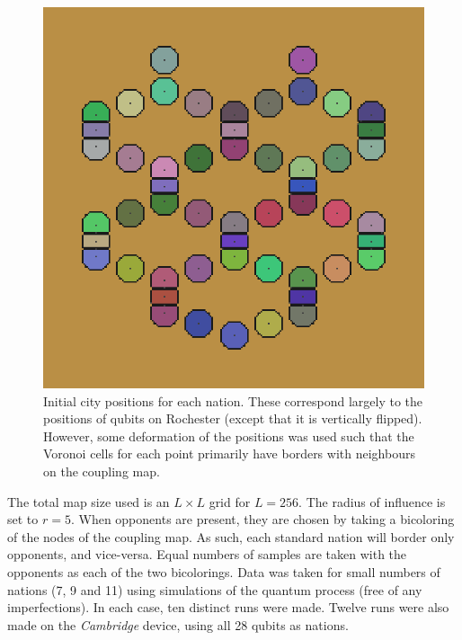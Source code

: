 \documentclass[conference]{IEEEtran}
\begin{document}
\begin{figure}[htbp]
\begin{center}
\includegraphics[width=0.95\columnwidth]{figures/initial.png}
\caption{Initial city positions for each nation. These correspond largely to the positions of qubits on Rochester (except that it is vertically flipped). However, some deformation of the positions was used such that the Voronoi cells for each point primarily have borders with neighbours on the coupling map.}
\label{initial}
\end{center}
\end{figure}


The total map size used is an $L \times L$ grid for $L=256$. The radius of influence is set to $r=5$. When opponents are present, they are chosen by taking a bicoloring of the nodes of the coupling map. As such, each standard nation will border only opponents, and vice-versa. Equal numbers of samples are taken with the opponents as each of the two bicolorings. Data was taken for small numbers of nations (7, 9 and 11) using simulations of the quantum process (free of any imperfections). In each case, ten distinct runs were made. Twelve runs were also made on the \textit{Cambridge} device, using all 28 qubits as nations.
\end{document}
